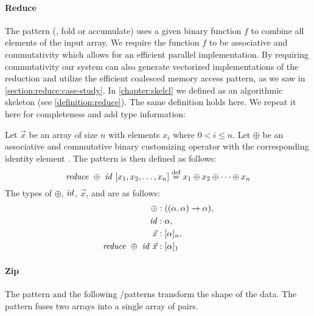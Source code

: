 \paragraph{Reduce}
The \reduce pattern (\aka, fold or accumulate) uses a given binary function $f$ to combine all elements of the input array.
We require the function $f$ to be associative and commutativity which allows for an efficient parallel implementation.
By requiring commutativity our system can also generate vectorized implementations of the reduction and utilize the efficient coalesced memory access pattern, as we saw in \autoref{section:reduce:case-study}.
In \autoref{chapter:skelcl} we defined \reduce as an algorithmic skeleton (see \autoref{definition:reduce}).
The same definition holds here.
We repeat it here for completeness and add type information:
\begin{definition}
  \label{definition:pattern:reduce}
  Let $\vec{x}$ be an array of size $n$ with elements $x_i$ where $0 < i \leq n$.
  Let $\oplus$ be an associative and commutative binary customizing operator with the corresponding identity element \id.
  The \reduce pattern is then defined as follows:
  \begin{equation*}
    \text{\textit{reduce}}\ \oplus\ \text{\textit{id}}\ [x_1, x_2, \dots, x_n]
      \stackrel{\textrm{\scriptsize def}}{=} x_1 \oplus x_2 \oplus \dots \oplus x_n
  \end{equation*}
  The types of $\oplus$, $\text{\textit{id}}$, $\vec{x}$, and \reduce are as follows:
  \begin{align*}
    \oplus &: ((\alpha, \alpha) \rightarrow \alpha),\\
    \text{\textit{id}} &: \alpha,\\
    \vec{x} &: [\alpha]_n,\\
    \text{\textit{reduce}}\ \oplus\ \text{\textit{id}}\ \vec{x} &: [\alpha]_1
  \end{align*}
\end{definition}


\paragraph{Zip}
The \zip pattern and the following \splitN/\join patterns transform the shape of the data. %
The \zip pattern fuses two arrays into a single array of pairs.

